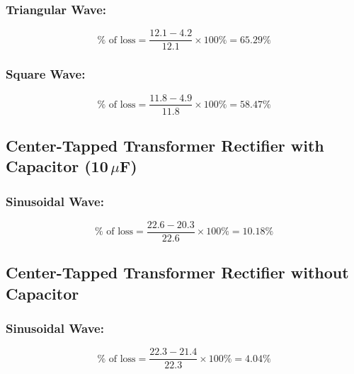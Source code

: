 \subsubsection{Triangular Wave:}
\begin{equation}
  \% \text{ of loss} = \frac{12.1 - 4.2}{12.1} \times 100\% = 65.29\%
\end{equation}

\subsubsection{Square Wave:}
\begin{equation}
  \% \text{ of loss} = \frac{11.8 - 4.9}{11.8} \times 100\% = 58.47\%
\end{equation}

\subsection{Center-Tapped Transformer Rectifier with Capacitor (10\,$\mu$F)}

\subsubsection{Sinusoidal Wave:}
\begin{equation}
  \% \text{ of loss} = \frac{22.6 - 20.3}{22.6} \times 100\% = 10.18\%
\end{equation}

\subsection{Center-Tapped Transformer Rectifier without Capacitor}

\subsubsection{Sinusoidal Wave:}
\begin{equation}
  \% \text{ of loss} = \frac{22.3 - 21.4}{22.3} \times 100\% = 4.04\%
\end{equation}
